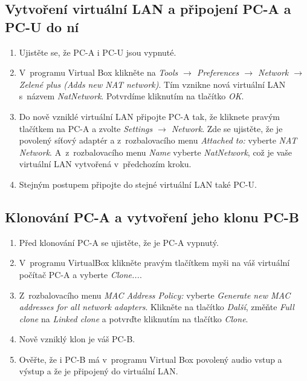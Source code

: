 \subsection{Vytvoření virtuální LAN a připojení PC-A a PC-U do ní}
\begin{enumerate}
  \item Ujistěte se, že PC-A i PC-U jsou vypnuté.
  \item V~programu Virtual Box klikněte na \emph{Tools $\rightarrow$ Preferences $\rightarrow$ Network $\rightarrow$ Zelené plus (Adds new NAT network)}. Tím vznikne nová virtuální LAN s~názvem \emph{NatNetwork}. Potvrdíme kliknutím na tlačítko \emph{OK}.
  \item Do nově vzniklé virtuální LAN připojte PC-A tak, že kliknete pravým tlačítkem na PC-A a zvolte \emph{Settings $\rightarrow$ Network}. Zde se ujistěte, že je povolený síťový adaptér a z~rozbalovacího menu \emph{Attached to:} vyberte \emph{NAT Network}. A~z~rozbalovacího menu \emph{Name} vyberte \emph{NatNetwork}, což je vaše virtuální LAN vytvořená v~předchozím kroku.
  \item Stejným postupem připojte do stejné virtuální LAN také PC-U.
\end{enumerate}


\subsection{Klonování PC-A a vytvoření jeho klonu PC-B}
\begin{enumerate}
	\item Před klonování PC-A se ujistěte, že je PC-A vypnutý.
	\item V~programu VirtualBox klikněte pravým tlačítkem myši na váš virtuální počítač PC-A a vyberte \emph{Clone...}.
	\item Z~rozbalovacího menu \emph{MAC Address Policy:} vyberte \emph{Generate new MAC addresses for all network adapters}. Klikněte na tlačítko \emph{Další}, změňte \emph{Full clone} na \emph{Linked clone} a potvrďte kliknutím na tlačítko \emph{Clone}.
	\item Nově vzniklý klon je váš PC-B.
	\item Ověřte, že i PC-B má v~programu Virtual Box povolený audio vstup a výstup a že je připojený do virtuální LAN.
\end{enumerate}


